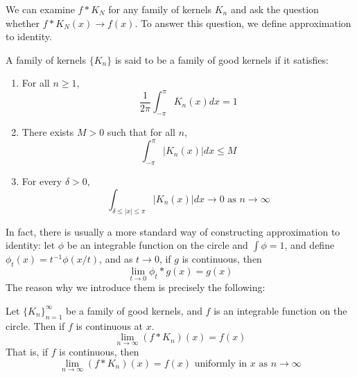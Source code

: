 We can examine $f\ast K_N$ for any family of kernels $K_n$ and ask the question whether $f\ast K_N(x)\to f(x)$. To answer this question, we define approximation to identity.
\begin{defn}
    A family of kernels $\{K_n\}$ is said to be a family of good kernels if it satisfies:
    \begin{enumerate}
        \item For all $n\geq 1$, 
        \begin{equation*}
            \frac{1}{2\pi}\int_{-\pi}^\pi K_n(x)dx=1
        \end{equation*}
        \item There exists $M>0$ such that for all $n$, 
        \begin{equation*}
            \int_{-\pi}^\pi|K_n(x)|dx\leq M
        \end{equation*}
        \item For every $\delta>0$, 
        \begin{equation*}
            \int_{\delta\leq|x|\leq\pi}|K_n(x)|dx\to 0 \text{ as } n\to\infty
        \end{equation*}
    \end{enumerate}
\end{defn}
In fact, there is usually a more standard way of constructing approximation to identity: let $\phi$ be an integrable function on the circle and $\int\phi=1$, and define $\phi_t(x)=t^{-1}\phi(x/t)$, and as $t\to 0$, if $g$ is continuous, then
\begin{equation*}
    \lim_{t\to 0}\phi_t\ast g(x)=g(x)
\end{equation*}
The reason why we introduce them is precisely the following:
\begin{thm}
    Let $\{K_n\}_{n=1}^\infty$ be a family of good kernels, and $f$ is an integrable function on the circle. Then if $f$ is continuous at $x$. 
    \begin{equation*}
        \lim_{n\to\infty}(f\ast K_n)(x)=f(x)
    \end{equation*}
    That is, if $f$ is continuous, then 
    \begin{equation*}
        \lim_{n\to\infty}(f\ast K_n)(x)=f(x) \text{ uniformly in } x \text{ as } n\to\infty
    \end{equation*}
\end{thm}
